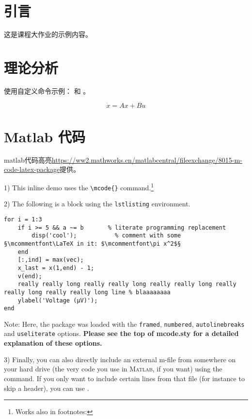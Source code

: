 \documentclass{sysureport}
\author{硕士}
\begin{document}
\maketitlepage

\section{引言}
这是课程大作业的示例内容。

\section{理论分析}
使用自定义命令示例： 和 。

\begin{equation}
\dot{x} = Ax + Bu
\end{equation}

\section{Matlab 代码}

matlab代码高亮\url{https://ww2.mathworks.cn/matlabcentral/fileexchange/8015-m-code-latex-package}提供。


1) This inline demo  uses the \verb|\mcode{}| command.\footnote{Works also in footnotes: }

2) The following is a block using the \verb|lstlisting| environment.
\begin{lstlisting}
for i = 1:3
	if i >= 5 && a ~= b       % literate programming replacement
		disp('cool');           % comment with some §\mcommentfont\LaTeX in it: $\mcommentfont\pi x^2$§
	end
	[:,ind] = max(vec);
	x_last = x(1,end) - 1;
	v(end);
	really really long really really long really really long really really long really really long line % blaaaaaaaa
	ylabel('Voltage (µV)');
end
\end{lstlisting}
Note: Here, the package was loaded with the \verb|framed|, \verb|numbered|, \verb|autolinebreaks| and \verb|useliterate| options.  \textbf{Please see the top of mcode.sty for a detailed explanation of these options.}


3) Finally, you can also directly include an external m-file from somewhere on your hard drive (the very code you use in \textsc{Matlab}, if you want) using the \verb|| command.  If you only want to include certain lines from that file (for instance to skip a header), you can use \verb||.
\end{document}
